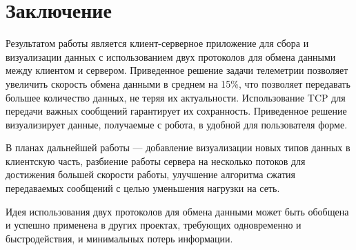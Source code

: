 \documentclass[conference]{IEEEtran}
\begin{document}
\section{Заключение}
Результатом работы является клиент-серверное приложение для сбора и визуализации данных с использованием двух протоколов для обмена данными между клиентом и сервером. Приведенное решение задачи телеметрии позволяет увеличить скорость обмена данными в среднем на 15\%, что позволяет передавать большее количество данных, не теряя их актуальности. Использование TCP для передачи важных сообщений гарантирует их сохранность. Приведенное решение визуализирует данные, получаемые с робота, в удобной для пользователя форме. 

В планах дальнейшей работы --- добавление визуализации новых типов данных в клиентскую часть, разбиение работы сервера на несколько потоков для достижения большей скорости работы, улучшение алгоритма сжатия передаваемых сообщений с целью уменьшения нагрузки на сеть.

Идея использования двух протоколов для обмена данными может быть обобщена и успешно применена в других проектах, требующих одновременно и быстродействия, и минимальных потерь информации.
\end{document}
